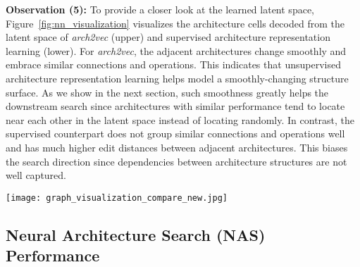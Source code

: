 \vspace{2mm}
\textbf{Observation (5):} To provide a closer look at the learned latent space, Figure~\ref{fig:nn_visualization} visualizes the architecture cells decoded from the latent space of \textit{arch2vec} (upper) and supervised architecture representation learning (lower).
For \textit{arch2vec}, the adjacent architectures change smoothly and embrace similar connections and operations. This indicates that unsupervised architecture representation learning helps model a smoothly-changing structure surface. As we show in the next section, such smoothness greatly helps the downstream search since architectures with similar performance tend to locate near each other in the latent space instead of locating randomly. 
In contrast, the supervised counterpart does not group similar connections and operations well and has much higher edit distances between adjacent architectures. This biases the search direction since dependencies between architecture structures are not well captured. 



\vspace{-2mm}
\begin{figure*}[h]
\centering
\texttt{[image: graph\_visualization\_compare\_new.jpg]}
\caption{Visualization of a sequence of architecture cells decoded from the learned latent space of \textit{arch2vec} (upper) and supervised architecture representation learning (lower) on NAS-Bench-101. The two sequences start from the same architecture. For both sequences, each architecture is the closest point of the previous one in the latent space excluding previously visited ones.  Edit distances between adjacent architectures of the upper sequence are 4, 6, 1, 5, 1, 1, 1, 5, 2, 3, 2, 4, 2, 5, 2, and the average is 2.9. Edit distances between adjacent architectures of the lower sequence are 8, 6, 7, 7, 9, 8, 11,  11, 6, 10, 10, 11, 10, 11, 9, and the average is 8.9.}
\vspace{-1mm}
\label{fig:nn_visualization}
\end{figure*}






\vspace{1mm}
\subsection{Neural Architecture Search (NAS) Performance}



